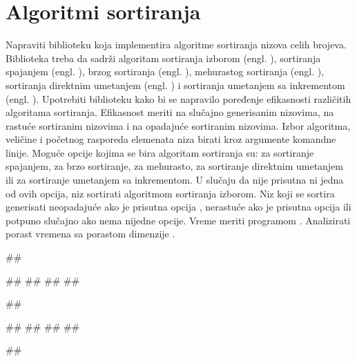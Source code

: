 \section{Algoritmi sortiranja}

\begin{Exercise}[label=3-11]
  Napraviti biblioteku koja implementira algoritme sortiranja nizova
  celih brojeva. Biblioteka treba da sadrži algoritam sortiranja
  izborom (engl. ), sortiranja spajanjem
  (engl. ), brzog sortiranja (engl. ), mehurastog sortiranja (engl. ),
  sortiranja direktnim umetanjem (engl. ) i
  sortiranja umetanjem sa inkrementom (engl. ). Upotrebiti biblioteku kako bi se napravilo poređenje
  efikasnosti različitih algoritama sortiranja. Efikasnost meriti na
  slučajno generisanim nizovima, na rastuće sortiranim nizovima i na
  opadajuće sortiranim nizovima. Izbor algoritma, veličine i početnog
  rasporeda elemenata niza birati kroz argumente komandne
  linije. Moguće opcije kojima se bira algoritam sortiranja su:
   za sortiranje spajanjem,  za brzo sortiranje,
   za mehurasto,  za sortiranje direktnim
  umetanjem ili  za sortiranje umetanjem sa inkrementom. U
  slučaju da nije prisutna ni jedna od ovih opcija, niz sortirati
  algoritmom sortiranja izborom. Niz koji se sortira generisati
  neopadajuće ako je prisutna opcija , nerastuće ako je
  prisutna opcija  ili potpuno slučajno ako nema nijedne
  opcije. Vreme meriti programom . Analizirati porast
  vremena sa porastom dimenzije .

\begin{minitest}
\begin{test}{1}
##
  
#\naslovIzlaz#
##
##
##
\end{test}
\end{minitest}
\begin{minitest}
\begin{test}{2}
##
  
#\naslovIzlaz#
##
##
##
\end{test}
\end{minitest}
\begin{minitest}
\begin{test}{3}
##
  

\end{test}
\end{minitest}
\end{Exercise}
